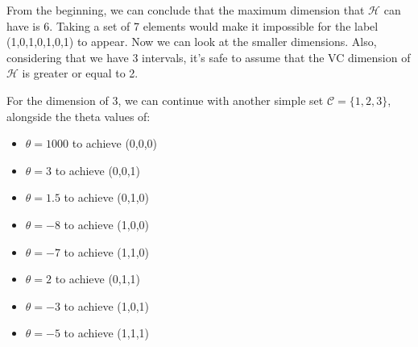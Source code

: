 \documentclass[11pt, a4paper]{article}
\begin{document}
\begin{large}
From the beginning, we can conclude that the maximum dimension that $\mathcal{H}$ can have is 6. Taking a set of 7 elements would make it impossible for the label (1,0,1,0,1,0,1) to appear. Now we can look at the smaller dimensions. Also, considering that we have 3 intervals, it's safe to assume that the VC dimension of $\mathcal{H}$ is greater or equal to 2.

For the dimension of 3, we can continue with another simple set $\mathcal{C} = \{1,2,3\}$, alongside the theta values of:
\begin{itemize}
    \item $\theta = 1000$ to achieve (0,0,0)
     \item $\theta = 3$ to achieve (0,0,1)
      \item $\theta = 1.5$ to achieve (0,1,0)
      \item $\theta = -8$ to achieve (1,0,0)
      \item $\theta = -7$ to achieve (1,1,0)
      \item $\theta = 2$ to achieve (0,1,1)
      \item $\theta = -3$ to achieve (1,0,1)
      \item $\theta = -5$ to achieve (1,1,1)
\end{itemize}


\end{large}
\end{document}
